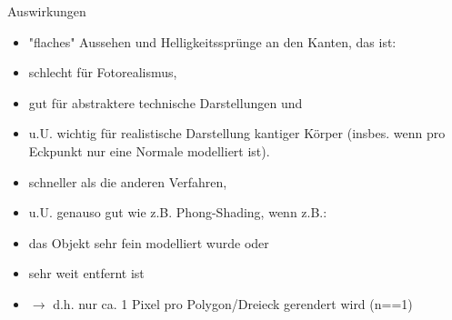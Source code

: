 \documentclass[10pt,landscape]{article}
\begin{document}
\begin{multicols}{3}
Auswirkungen
\begin{itemize}
  \item "flaches" Aussehen und Helligkeitssprünge an den Kanten, das ist:
  \item schlecht für Fotorealismus,
  \item gut für abstraktere technische Darstellungen und
  \item u.U. wichtig für realistische Darstellung kantiger Körper (insbes. wenn pro Eckpunkt nur eine Normale modelliert ist).
  \item schneller als die anderen Verfahren,
  \item u.U. genauso gut wie z.B. Phong-Shading, wenn z.B.:
  \item das Objekt sehr fein modelliert wurde oder
  \item sehr weit entfernt ist
  \item $\rightarrow$ d.h. nur ca. 1 Pixel pro Polygon/Dreieck gerendert wird (n==1)
\end{itemize}


\end{multicols}
\end{document}
